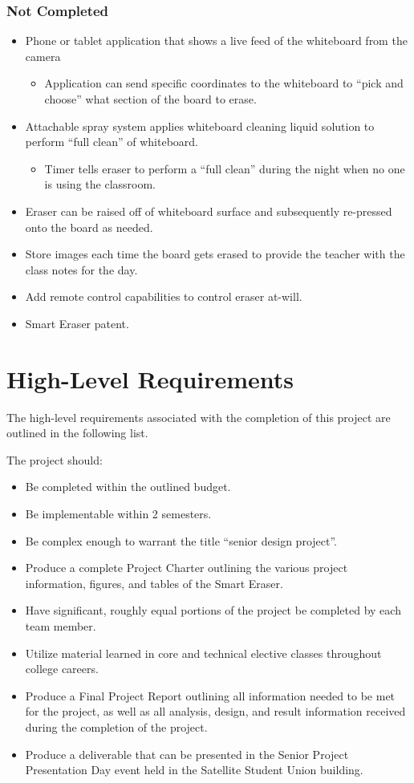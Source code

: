 \subsubsection{Not Completed}
 \begin{itemize}
 	\item Phone or tablet application that shows a live feed of the whiteboard from the camera
 		\begin{itemize}
 		\item Application can send specific coordinates to the whiteboard to ``pick and choose'' what section of the board to erase.
 		\end{itemize}
 	\item Attachable spray system applies whiteboard cleaning liquid solution to perform ``full clean'' of whiteboard.
 		\begin{itemize}
		\item Timer tells eraser to perform a ``full clean'' during the night when no one is using the classroom.
		\end{itemize}
 	\item Eraser can be raised off of whiteboard surface and subsequently re-pressed onto the board as needed.
 	\item Store images each time the board gets erased to provide the teacher with the class notes for the day.
 	\item Add remote control capabilities to control eraser at-will.
 	\item Smart Eraser patent.
 \end{itemize}

 \section{High-Level Requirements}
The high-level requirements associated with the completion of this project are outlined in the following list. \par
\setlength{\parindent}{2.5ex} The project should:
\begin{itemize}
\item Be completed within the outlined budget.
\item Be implementable within 2 semesters.
\item Be complex enough to warrant the title ``senior design project''.
\item Produce a complete Project Charter outlining the various project information, figures, and tables of the Smart Eraser.
\item Have significant, roughly equal portions of the project be completed by each team member.
\item Utilize material learned in core and technical elective classes throughout college careers.
\item Produce a Final Project Report outlining all information needed to be met for the project, as well as all analysis, design, and result information received during the completion of the project.
\item Produce a deliverable that can be presented in the Senior Project Presentation Day event held in the Satellite Student Union building.
\end{itemize}

